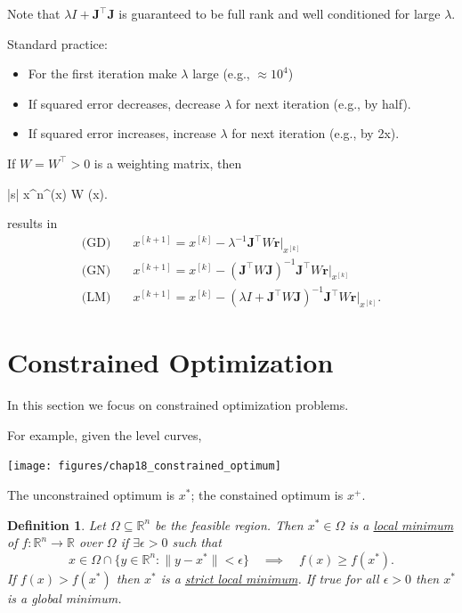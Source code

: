 \documentclass{article}
\newtheorem{definition}[theorem]{Definition}
\newcommand{\rbf}{\mathbf{r}}
\newcommand{\Jbf}{\mathbf{J}}
\begin{document}
	Note that $\lambda I + \Jbf^\top \Jbf$ is guaranteed to be full rank and well conditioned for large $\lambda$.
	
	Standard practice:
	\begin{itemize}
		\item For the first iteration make $\lambda$ large (e.g., $\approx 10^4$)
		\item If squared error decreases, decrease $\lambda$ for next iteration (e.g., by half).
		\item If squared error increases, increase $\lambda$ for next iteration (e.g., by 2x).
	\end{itemize}

	If $W=W^\top >0$ is a weighting matrix, then 
	\begin{mini*}|s|
		{x\in{}^n}{\rbf^\top(x) W \rbf(x)}{}{}.
	\end{mini*}
	results in
	\begin{align*}
		\text{(GD)} &\quad 	x^{[k+1]} = x^{[k]} - \lambda^{-1} \Jbf^\top W \rbf\big|_{x^{[k]}} \\
		\text{(GN)} &\quad 	x^{[k+1]} = x^{[k]} - \left(\Jbf^\top W \Jbf\right)^{-1} \Jbf^\top W \rbf\big|_{x^{[k]}} \\
		\text{(LM)} &\quad 	x^{[k+1]} = x^{[k]} - \left(\lambda I + \Jbf^\top W \Jbf\right)^{-1} \Jbf^\top W \rbf\big|_{x^{[k]}}.		
	\end{align*}


\section{Constrained Optimization}

	In this section we focus on constrained optimization problems.
	
	
	For example, given the level curves,
	\begin{center}
		\texttt{[image: figures/chap18\_constrained\_optimum]}
	\end{center}
	The unconstrained optimum is $x^{\ast}$; the constained optimum is $x^{+}$.

	\begin{definition}
		Let $\Omega \subseteq \mathbb{R}^n$ be the feasible region.  
		Then $x^{\ast}\in \Omega$ is a \underline{local minimum} of $f:\mathbb{R}^n\to\mathbb{R}$ over $\Omega$ if $\exists \epsilon > 0$ such that 
		\[
			x \in \Omega \cap \{y\in \mathbb{R}^n:\|y-x^{\ast}\|<\epsilon\} \quad \implies \quad f(x) \geq f(x^{\ast}).
		\]
		If $f(x) > f(x^{\ast})$ then $x^{\ast}$ is a \underline{strict local minimum}.  
		If true for all $\epsilon > 0$ then $x^{\ast}$ is a global minimum.
	\end{definition}
	
\end{document}
